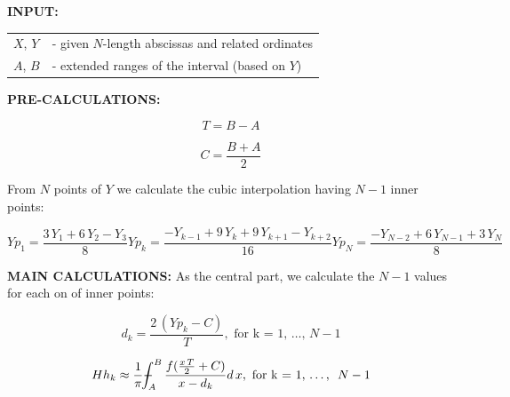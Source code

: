 \documentclass[12pt,twoside,a4paper]{article}
\def\emptyline{\vspace{12pt}}
\numberwithin{equation}{subsection}
\numberwithin{figure}{subsection}
\def\Xint#1{\mathchoice
{\XXint\displaystyle\textstyle{#1}}%
{\XXint\textstyle\scriptstyle{#1}}%
{\XXint\scriptstyle\scriptscriptstyle{#1}}%
{\XXint\scriptscriptstyle\scriptscriptstyle{#1}}%
\!\int}
\def\XXint#1#2#3{{\setbox0=\hbox{$#1{#2#3}{\int}$ }\vcenter{\hbox{$#2#3$ }}\kern-.6\wd0}}
\def\dashint{\Xint-}
\begin{document}
\textbf{INPUT:}
 

\begin{tabular}{ l l }

  $X$, $Y$ &- given $N$-length abscissas and related ordinates \\
  $A$, $B$ &- extended ranges of the interval (based on $Y$) \\
  
\end{tabular}


\emptyline


\textbf{PRE-CALCULATIONS:}

\begin{equation} \label{eq:cci_period}
  T = B - A
\end{equation}

\begin{equation} \label{eq:cci_center}
  C = \frac{B+A}{2}
\end{equation}

From $N$ points of $Y$ we calculate the cubic interpolation having $N-1$ inner points:

\begin{subequations} \label{eq:cci_cubicinterpolation}
  \begin{equation}   \label{eq:ccicinterp_first}
    {Yp_{1}}=\frac {3\,{Y_{1}} + 6\,{Y_{2}} - {Y_{3}}}{8}
  \end{equation}
  \begin{equation}   \label{eq:ccicinterp_next}
    {Yp_{k}}=\frac { - {Y_{k - 1}} + 9\,{Y_{k}} + 9\,{Y_{k + 1}} - {Y_{k + 2}}}{16}
  \end{equation}
  \begin{equation}   \label{eq:ccicinterp_last}
    {Yp_{N}}=\frac { - {Y_{N - 2}} + 6\,{Y_{N - 1}} + 3\,{Y_{N}}}{8}
  \end{equation}
\end{subequations}

\textbf{MAIN CALCULATIONS:}
As the central part, we calculate the $N-1$ values for each on of inner points: 

\begin{equation} \label{eq:cci_newd}
	d_k= \frac{2 \, (Yp_{k} - C ) }{T}, \text{ for k = 1, \ldots , \ $N-1$}
\end{equation}

\begin{equation} \label{eq:cci_approx}
  Hh_{k} \approx \frac{1}{\pi} \dashint_{A}^{B} \frac{f(\frac{x \, T}{2} + C)}{x-d_k} d\,x, \text{ for k = 1, \ldots , \ $N-1$}
\end{equation}
\end{document}
